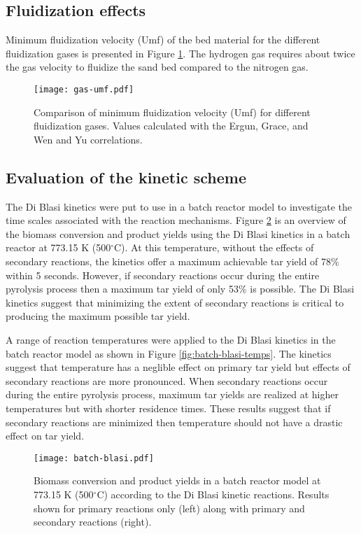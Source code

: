 \subsection{Fluidization effects}

Minimum fluidization velocity (Umf) of the bed material for the different fluidization gases is presented in Figure \ref{fig:gas-umf}. The hydrogen gas requires about twice the gas velocity to fluidize the sand bed compared to the nitrogen gas.

\begin{figure}[H]
    \centering
    \texttt{[image: gas-umf.pdf]}
    \caption{Comparison of minimum fluidization velocity (Umf) for different fluidization gases. Values calculated with the Ergun, Grace, and Wen and Yu correlations.}
    \label{fig:gas-umf}
\end{figure}

\subsection{Evaluation of the kinetic scheme}

The Di Blasi kinetics were put to use in a batch reactor model to investigate the time scales associated with the reaction mechanisms. Figure \ref{fig:batch-blasi} is an overview of the biomass conversion and product yields using the Di Blasi kinetics in a batch reactor at 773.15 K (500$^\circ$C). At this temperature, without the effects of secondary reactions, the kinetics offer a maximum achievable tar yield of 78\% within 5 seconds. However, if secondary reactions occur during the entire pyrolysis process then a maximum tar yield of only 53\% is possible. The Di Blasi kinetics suggest that minimizing the extent of secondary reactions is critical to producing the maximum possible tar yield.

A range of reaction temperatures were applied to the Di Blasi kinetics in the batch reactor model as shown in Figure \ref{fig:batch-blasi-temps}. The kinetics suggest that temperature has a neglible effect on primary tar yield but effects of secondary reactions are more pronounced. When secondary reactions occur during the entire pyrolysis process, maximum tar yields are realized at higher temperatures but with shorter residence times. These results suggest that if secondary reactions are minimized then temperature should not have a drastic effect on tar yield.

\begin{figure}[H]
    \centering
    \texttt{[image: batch-blasi.pdf]}
    \caption{Biomass conversion and product yields in a batch reactor model at 773.15 K (500$^\circ$C) according to the Di Blasi kinetic reactions. Results shown for primary reactions only (left) along with primary and secondary reactions (right).}
    \label{fig:batch-blasi}
\end{figure}

